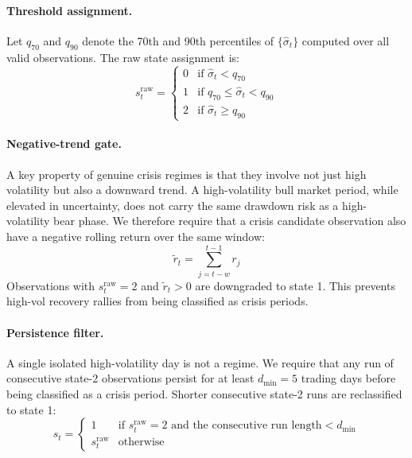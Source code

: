 \documentclass[12pt]{article}
\begin{document}
\paragraph{Threshold assignment.}
Let $q_{70}$ and $q_{90}$ denote the 70th and 90th percentiles of $\{\hat{\sigma}_t\}$
computed over all valid observations. The raw state assignment is:
\begin{equation}
  s_t^{\text{raw}} = \begin{cases}
    0 & \text{if } \hat{\sigma}_t < q_{70} \\
    1 & \text{if } q_{70} \leq \hat{\sigma}_t < q_{90} \\
    2 & \text{if } \hat{\sigma}_t \geq q_{90}
  \end{cases}
\end{equation}

\paragraph{Negative-trend gate.}
A key property of genuine crisis regimes is that they involve not just high volatility
but also a downward trend. A high-volatility bull market period, while elevated in
uncertainty, does not carry the same drawdown risk as a high-volatility bear phase.
We therefore require that a crisis candidate observation also have a negative rolling
return over the same window:
\begin{equation}
  \tilde{r}_t = \sum_{j=t-w}^{t-1} r_j
\end{equation}
Observations with $s_t^{\text{raw}} = 2$ and $\tilde{r}_t > 0$ are downgraded to
state 1. This prevents high-vol recovery rallies from being classified as crisis periods.

\paragraph{Persistence filter.}
A single isolated high-volatility day is not a regime. We require that any run of
consecutive state-2 observations persist for at least $d_{\min} = 5$ trading days
before being classified as a crisis period. Shorter consecutive state-2 runs are
reclassified to state 1:
\begin{equation}
  s_t = \begin{cases}
    1 & \text{if } s_t^{\text{raw}} = 2 \text{ and the consecutive run length} < d_{\min} \\
    s_t^{\text{raw}} & \text{otherwise}
  \end{cases}
\end{equation}
\end{document}
